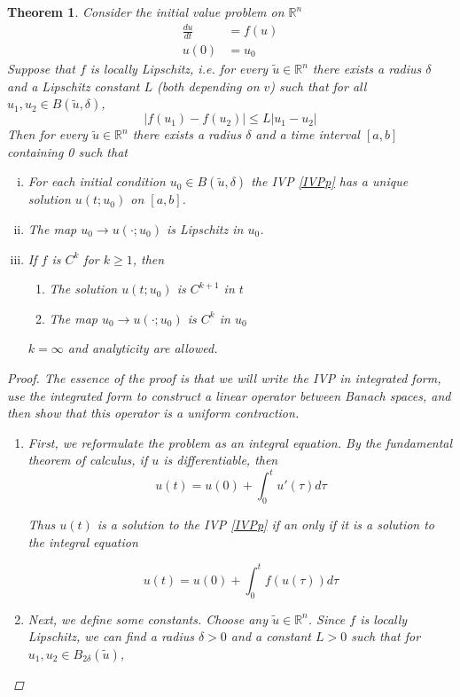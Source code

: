 \documentclass{article}
\newtheorem{theorem}{Theorem}[section]
\def\R{{\mathbb R}}
\begin{document}
\begin{theorem}
Consider the initial value problem on $\R^n$
\begin{align}\label{IVPp}
\frac{du}{dt} &= f(u) \\
u(0) &= u_0 \nonumber
\end{align}
Suppose that $f$ is locally Lipschitz, i.e. for every $\tilde{u} \in \R^n$ there exists a radius $\delta$ and a Lipschitz constant $L$ (both depending on $v$) such that for all $u_1, u_2 \in B(\tilde{u}, \delta)$,
\[
|f(u_1) - f(u_2)| \leq L|u_1 - u_2|
\]
Then for every $\tilde{u} \in \R^n$ there exists a radius $\delta$ and a time interval $[a, b]$ containing 0 such that
\begin{enumerate}[(i)]
\item For each initial condition $u_0 \in B(\tilde{u}, \delta)$ the IVP \eqref{IVPp} has a unique solution $u(t; u_0)$ on $[a, b]$.
\item The map $u_0 \rightarrow u(\cdot; u_0)$ is Lipschitz in $u_0$.
\item If $f$ is $C^k$ for $k \geq 1$, then
\begin{enumerate}
\item The solution $u(t; u_0)$ is $C^{k+1}$ in $t$
\item The map $u_0 \rightarrow u(\cdot; u_0)$ is $C^k$ in $u_0$
\end{enumerate}
$k = \infty$ and analyticity are allowed.
\end{enumerate}
\begin{proof}
The essence of the proof is that we will write the IVP in integrated form, use the integrated form to construct a linear operator between Banach spaces, and then show that this operator is a uniform contraction.
\begin{enumerate}
\item First, we reformulate the problem as an integral equation. By the fundamental theorem of calculus, if $u$ is differentiable, then
\begin{equation*}
u(t) = u(0) + \int_0^t u'(\tau) d \tau
\end{equation*}

Thus $u(t)$ is a solution to the IVP \eqref{IVPp} if an only if it is a solution to the integral equation

\begin{equation}\label{intform}
u(t) = u(0) + \int_0^t f(u(\tau)) d \tau
\end{equation}

\item Next, we define some constants. Choose any $\tilde{u} \in \R^n$.
Since $f$ is locally Lipschitz, we can find a radius $\delta > 0$ and a constant $L > 0$ such that for $u_1, u_2 \in B_{2 \delta}(\tilde{u})$,


\end{enumerate}
\end{proof}
\end{theorem}
\end{document}
